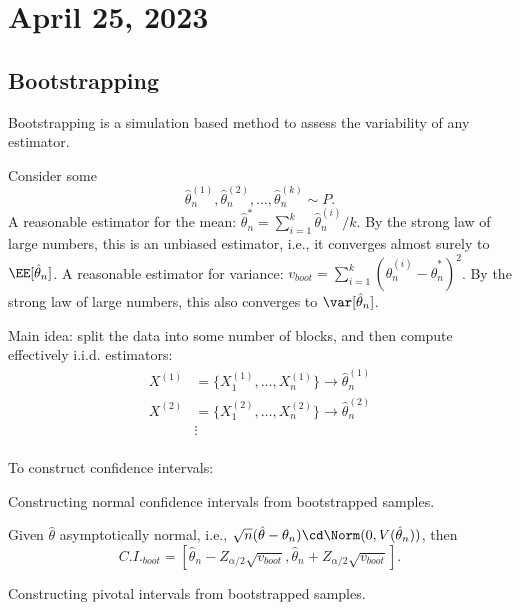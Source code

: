 \section{April 25, 2023}

\subsection{Bootstrapping}

\begin{definition}

\ac{Bootstrapping} is a simulation based method to assess the variability of any estimator. 
\end{definition}

Consider some 
\[\hat{\theta}_n^{(1)}, \hat{\theta}_n^{(2)}, \hdots, \hat{\theta}_n^{(k)}\sim P.\]
A reasonable estimator for the mean: $\hat{\theta}_n^* = \sum_{i=1}^k\hat{\theta}_n^{(i)}/k$. By the strong law of large numbers, this is an unbiased estimator, i.e., it converges almost surely to $\EE[\hat{\theta}_n]$. A reasonable estimator for variance: $v_{boot} = \sum_{i=1}^k(\hat{\theta}_n^{(i)}-\hat{\theta}_n^*)^2$. By the strong law of large numbers, this also converges to $\var[\hat{\theta}_n]$.

Main idea: split the data into some number of blocks, and then compute effectively i.i.d. estimators:
\begin{align*}
    X^{(1)} &=\{X_1^{(1)}, \hdots, X_n^{(1)}\} \rightarrow \hat{\theta}_n^{(1)}\\
    X^{(2)} &=\{X_1^{(2)}, \hdots, X_n^{(2)}\} \rightarrow \hat{\theta}_n^{(2)}\\
    &\vdots\\
\end{align*}

To construct confidence intervals:

\begin{example}
\exlabel

Constructing normal confidence intervals from bootstrapped samples.
\end{example}

Given $\hat{\theta}$ asymptotically normal, i.e., $\sqrt{n}(\hat{\theta}-\theta_n)\cd \Norm(0,V(\hat{\theta}_n))$, then 
 \[C.I._{boot} = \left[\hat{\theta}_n-Z_{\alpha/2}\sqrt{v_{boot}}, \hat{\theta}_n+Z_{\alpha/2}\sqrt{v_{boot}}\right].\]

\begin{example}
\exlabel

Constructing \ac{pivotal intervals} from bootstrapped samples. 
\end{example}

